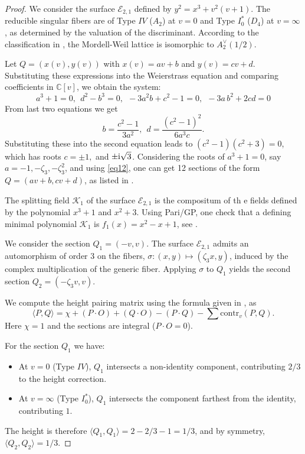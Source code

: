\documentclass[11pt]{amsart}
\newcommand{\Ee}{{\mathcal E}}
\newcommand{\KK}{{\mathcal K}}
\numberwithin{equation}{section}
\numberwithin{table}{section}
\newcommand\<{\langle}
\begin{document}
\begin{proof}
	We consider the surface $\mathcal{E}_{2,1}$ defined by $y^2 = x^3 + v^2 (v+1)$. The reducible singular fibers are of Type $IV$ ($A_2$) at $v=0$ and Type $I_0^*$ ($D_4$) at $v=\infty$, as determined by the valuation of the discriminant. According to the classification in \cite[Table 8.2, No. 32]{Schuett2019}, the Mordell-Weil lattice is isomorphic to $A_2^\vee(1/2)$.
	
	
	Let  $Q = (x(v), y(v))$ with $x(v) = a v + b$ and $y(v) = c v + d$. Substituting these expressions into the Weierstrass equation  and
	comparing coefficients in $\mathbb{C}[v]$, we obtain the system:
	\begin{equation*}
		a^3  +1= 0,  \ \ 	d^{2}-b^{3}=0, \ \ 
		-3 a^{2} b +c^{2}-1=0, \ \
		-3 a \,b^{2}+2 c d =0 
	\end{equation*}
From last two equations we get
\begin{equation}
	\label{eq12}
	b=\frac{c^{2}-1}{3 a^{2}}, \ \ d= \frac{\left(c^{2}-1\right)^{2}}{6 a^{3} c}.	\end{equation}	
	Substituting these into the second equation leads to 
	$(c^2-1)(c^2+3)=0$, which has roots
	$c=\pm 1, $ and $\pm {\rm{i}} \sqrt{3}$.	
 Considering  the roots of $a^3+1=0$, say $a=-1, -\zeta_3, -\zeta_3^2$, and 
 using \ref{eq12}, one can get 12 sections of the form $Q = (  a v + b,  c v + d)$, as listed in \cite[check1]{Shioda360-Codes}.


The splitting field $\KK_1$ of  the surface $\Ee_{2,1}$ is the compositum of th e fields defined by the polynomial $x^3+1$ and $x^2+3$. Using Pari/GP,   one check that  a defining minimal polynomial $\KK_1$ is
$f_1(x)= x^2-x+1$, 
see \cite[Gp360]{Shioda360-Codes}.

We consider the section $Q_1 = (-v, v)$. The surface $\Ee_{2,1}$ admits an automorphism of order 3 on the fibers, $\sigma: (x, y) \mapsto (\zeta_3 x, y)$, induced by the complex multiplication of the generic fiber. Applying $\sigma$ to $Q_1$ yields the second section $Q_2 = (-\zeta_3 v, v)$.
	
	We compute the height pairing matrix using the formula given in  \cite[Thm. 6.24]{Schuett2019}, as
	 $$\langle P, Q \rangle = \chi + (P \cdot O) + (Q \cdot O) - (P \cdot Q) - \sum \text{contr}_v(P, Q).$$ Here $\chi=1$ and the sections are integral ($P \cdot O = 0$).
	
	For the section $Q_1$ we have:
	\begin{itemize}
		\item At $v=0$ (Type $IV$), $Q_1$ intersects a non-identity component, contributing $2/3$ to the height correction.
		\item At $v=\infty$ (Type $I_0^*$), $Q_1$ intersects the component farthest from the identity, contributing $1$.
	\end{itemize}
	The height is therefore $\langle Q_1, Q_1 \rangle = 2 - 2/3 - 1 = 1/3$, and  by symmetry, $\langle Q_2, Q_2 \rangle = 1/3$.
	

\end{proof}
\end{document}
